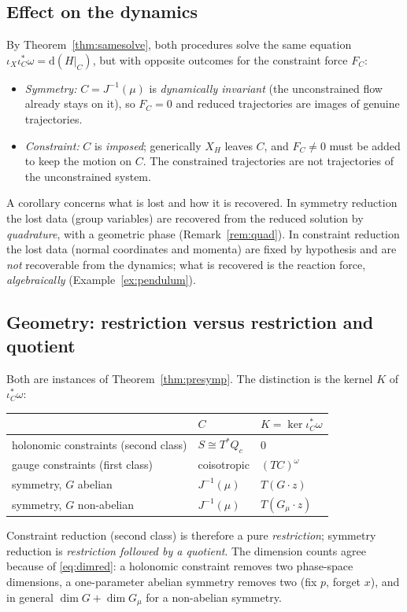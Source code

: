 \documentclass[11pt,a4paper]{article}
\numberwithin{equation}{section}
\theoremstyle{plain}
\theoremstyle{definition}
\theoremstyle{remark}
\newcommand{\dd}{\mathrm{d}}
\begin{document}
\subsection{Effect on the dynamics}

By Theorem~\ref{thm:samesolve}, both procedures solve the same equation $\iota_X\iota_C^*\omega=\dd(H|_C)$, but with opposite outcomes for the constraint force $F_C$:
\begin{itemize}
\item \emph{Symmetry:} $C=J^{-1}(\mu)$ is \emph{dynamically invariant} (the unconstrained flow already stays on it), so $F_C=0$ and reduced trajectories are images of genuine trajectories.
\item \emph{Constraint:} $C$ is \emph{imposed}; generically $X_H$ leaves $C$, and $F_C\neq0$ must be added to keep the motion on $C$. The constrained trajectories are not trajectories of the unconstrained system.
\end{itemize}
A corollary concerns what is lost and how it is recovered. In symmetry reduction the lost data (group variables) are recovered from the reduced solution by \emph{quadrature}, with a geometric phase (Remark~\ref{rem:quad}). In constraint reduction the lost data (normal coordinates and momenta) are fixed by hypothesis and are \emph{not} recoverable from the dynamics; what is recovered is the reaction force, \emph{algebraically} (Example~\ref{ex:pendulum}).

\subsection{Geometry: restriction versus restriction and quotient}

Both are instances of Theorem~\ref{thm:presymp}. The distinction is the kernel $K$ of $\iota_C^*\omega$:
\begin{center}
\begin{tabular}{@{}lll@{}}
\toprule
 & $C$ & $K=\ker\iota_C^*\omega$\\
\midrule
holonomic constraints (second class) & $S\cong T^*Q_c$ & $0$\\
gauge constraints (first class) & coisotropic & $(TC)^\omega$\\
symmetry, $G$ abelian & $J^{-1}(\mu)$ & $T(G\cdot z)$\\
symmetry, $G$ non-abelian & $J^{-1}(\mu)$ & $T(G_\mu\cdot z)$\\
\bottomrule
\end{tabular}
\end{center}
Constraint reduction (second class) is therefore a pure \emph{restriction}; symmetry reduction is \emph{restriction followed by a quotient}. The dimension counts agree because of \eqref{eq:dimred}: a holonomic constraint removes two phase-space dimensions, a one-parameter abelian symmetry removes two (fix $p$, forget $x$), and in general $\dim G+\dim G_\mu$ for a non-abelian symmetry.
\end{document}
